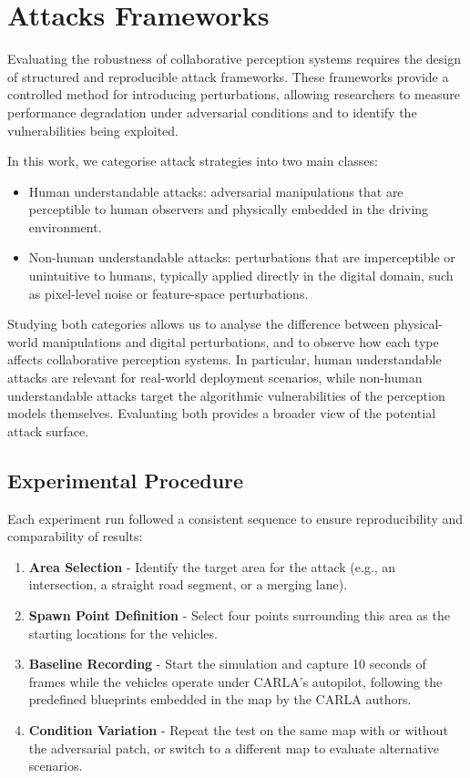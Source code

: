 \chapter{Attacks Frameworks}
\label{Attacks Frameworks}

Evaluating the robustness of collaborative perception systems requires the design of structured and reproducible attack frameworks.
These frameworks provide a controlled method for introducing perturbations, allowing researchers to measure performance degradation under adversarial conditions and to identify the vulnerabilities being exploited.

In this work, we categorise attack strategies into two main classes:
\begin{itemize}
    \item Human understandable attacks: adversarial manipulations that are perceptible to human observers and physically embedded in the driving environment.
    \item Non-human understandable attacks: perturbations that are imperceptible or unintuitive to humans, typically applied directly in the digital domain, such as pixel-level noise or feature-space perturbations.
\end{itemize}
Studying both categories allows us to analyse the difference between physical-world manipulations and digital perturbations, and to observe how each type affects collaborative perception systems.
In particular, human understandable attacks are relevant for real-world deployment scenarios, while non-human understandable attacks target the algorithmic vulnerabilities of the perception models themselves.
Evaluating both provides a broader view of the potential attack surface.

\section{Experimental Procedure}

Each experiment run followed a consistent sequence to ensure reproducibility and comparability of results:

\begin{enumerate}
    \item \textbf{Area Selection} - Identify the target area for the attack (e.g., an intersection, a straight road segment, or a merging lane).
    \item \textbf{Spawn Point Definition} - Select four points surrounding this area as the starting locations for the vehicles.
    \item \textbf{Baseline Recording} - Start the simulation and capture 10 seconds of frames while the vehicles operate under CARLA’s autopilot, following the predefined blueprints embedded in the map by the CARLA authors.
    \item \textbf{Condition Variation} - Repeat the test on the same map with or without the adversarial patch, or switch to a different map to evaluate alternative scenarios.
\end{enumerate}


